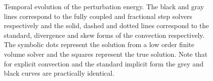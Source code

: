 \begin{figure}
 \centering
 \caption{ Temporal evolution of the perturbation energy. The black and gray lines correspond to the fully coupled and fractional step solvers respectively and the solid, dashed and dotted lines correspond to the standard, divergence and skew forms of the convection respectively. The symbolic dots represent the solution from a low order finite volume solver and the squares represent the true solution. Note that for explicit convection and the standard implicit form the grey and black curves are practically identical. }
\label{fig:OS_long_time}
\end{figure}

